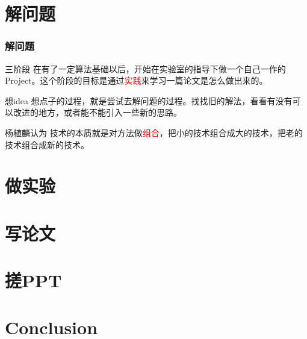 \documentclass{beamer}
\begin{document}
\section{解问题}
\begin{frame}
    \frametitle{解问题}
    \begin{block}{三阶段}
        在有了一定算法基础以后，开始在实验室的指导下做一个自己一作的Project。这个阶段的目标是通过\textcolor{red}{实践}来学习一篇论文是怎么做出来的。
    \end{block}
    \begin{exampleblock}{想idea}
        想点子的过程，就是尝试去解问题的过程。找找旧的解法，看看有没有可以改进的地方，或者能不能引入一些新的思路。
    \end{exampleblock}
    \begin{block}{杨植麟认为}
        技术的本质就是对方法做\textcolor{red}{组合}，把小的技术组合成大的技术，把老的技术组合成新的技术。
    \end{block}
\end{frame}



\section{做实验}

\section{写论文}

\section{搓PPT}

\section{Conclusion}
\end{document}
